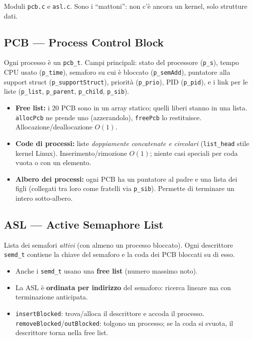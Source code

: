 \documentclass[11pt,a4paper]{article}
\newcommand{\code}[1]{\texttt{#1}}
\begin{document}
Moduli \code{pcb.c} e \code{asl.c}. Sono i ``mattoni'': non c'è ancora un
kernel, solo strutture dati.

\subsection{PCB --- Process Control Block}
Ogni processo è un \code{pcb\_t}. Campi principali: stato del processore
(\code{p\_s}), tempo CPU usato (\code{p\_time}), semaforo su cui è bloccato
(\code{p\_semAdd}), puntatore alla support struct (\code{p\_supportStruct}),
priorità (\code{p\_prio}), PID (\code{p\_pid}), e i link per le liste
(\code{p\_list}, \code{p\_parent}, \code{p\_child}, \code{p\_sib}).

\begin{itemize}
\item \textbf{Free list:} i 20 PCB sono in un array statico; quelli liberi
  stanno in una lista. \code{allocPcb} ne prende uno (azzerandolo),
  \code{freePcb} lo restituisce. Allocazione/deallocazione $O(1)$.
\item \textbf{Code di processi:} liste \emph{doppiamente concatenate e
  circolari} (\code{list\_head} stile kernel Linux). Inserimento/rimozione
  $O(1)$; niente casi speciali per coda vuota o con un elemento.
\item \textbf{Albero dei processi:} ogni PCB ha un puntatore al padre e una
  lista dei figli (collegati tra loro come fratelli via \code{p\_sib}).
  Permette di terminare un intero sotto-albero.
\end{itemize}

\subsection{ASL --- Active Semaphore List}
Lista dei semafori \emph{attivi} (con almeno un processo bloccato). Ogni
descrittore \code{semd\_t} contiene la chiave del semaforo e la coda dei PCB
bloccati su di esso.
\begin{itemize}
\item Anche i \code{semd\_t} usano una \textbf{free list} (numero massimo noto).
\item La ASL è \textbf{ordinata per indirizzo} del semaforo: ricerca lineare ma
  con terminazione anticipata.
\item \code{insertBlocked}: trova/alloca il descrittore e accoda il processo.
  \code{removeBlocked}/\code{outBlocked}: tolgono un processo; se la coda si
  svuota, il descrittore torna nella free list.
\end{itemize}
\end{document}
